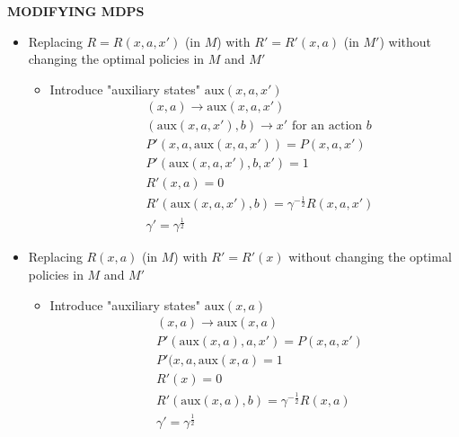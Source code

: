 \begin{whitebox}{\textbf{MODIFYING MDPS}}
    \begin{itemize}
        \item Replacing $R=R(x,a,x')$ (in $M$) with $R'=R'(x,a)$ (in $M'$) without changing the optimal policies in $M$ and $M'$
        \begin{itemize}
            \item Introduce "auxiliary states" $\mathrm{aux}(x,a,x')$
            \begin{align*}
                &(x,a)\to\mathrm{aux}(x,a,x')\\
                &(\mathrm{aux}(x,a,x'),b)\to x'\text{ for an action $b$}\\
                &P'(x,a,\mathrm{aux}(x,a,x'))=P(x,a,x')\\
                &P'(\mathrm{aux}(x,a,x'),b,x')=1\\
                &R'(x,a)=0\\
                &R'(\mathrm{aux}(x,a,x'),b)=\gamma^{-\frac{1}{2}}R(x,a,x')\\
                &\gamma'=\gamma^{\frac{1}{2}}
            \end{align*}
        \end{itemize}
        \item Replacing $R(x,a)$ (in $M$) with $R'=R'(x)$ without changing the optimal policies in $M$ and $M'$
        \begin{itemize}
            \item Introduce "auxiliary states" $\mathrm{aux}(x,a)$
            \begin{align*}
                &(x,a)\to\mathrm{aux}(x,a)\\
                &P'(\mathrm{aux}(x,a),a,x')=P(x,a,x')\\
                &P'(x,a,\mathrm{aux}(x,a)=1\\
                &R'(x)=0\\
                &R'(\mathrm{aux}(x,a),b)=\gamma^{-\frac{1}{2}}R(x,a)\\
                &\gamma'=\gamma^{\frac{1}{2}}
            \end{align*}
        \end{itemize}
    \end{itemize}
\end{whitebox}
